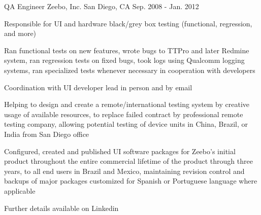 \begin{cventries}
\cventry
{QA Engineer} %
{Zeebo, Inc.} %
{San Diego, CA} %
{Sep. 2008 - Jan. 2012} %
{
\begin{cvitems}
\item[] {Responsible for UI and hardware black/grey box testing (functional, regression, and more)}
\item[]
\item {Ran functional tests on new features, wrote bugs to TTPro and later Redmine system, ran regression tests on fixed bugs, took logs using Qualcomm logging systems, ran specialized tests whenever necessary in cooperation with developers}
\item {Coordination with UI developer lead in person and by email}
\item {Helping to design and create a remote/international testing system by creative usage of available resources, to replace failed contract by professional remote testing company, allowing potential testing of device units in China, Brazil, or India from San Diego office}
\item {Configured, created and published UI software packages for Zeebo's initial product throughout the entire commercial lifetime of the product through three years, to all end users in Brazil and Mexico, maintaining revision control and backups of major packages customized for Spanish or Portuguese language where applicable}
\end{cvitems}
}

\cventry
{} %
{Further details available on Linkedin} %
{} %
{} %
{
\begin{cvitems}
\item[] {}
\item[]
\end{cvitems}
}

\end{cventries}
